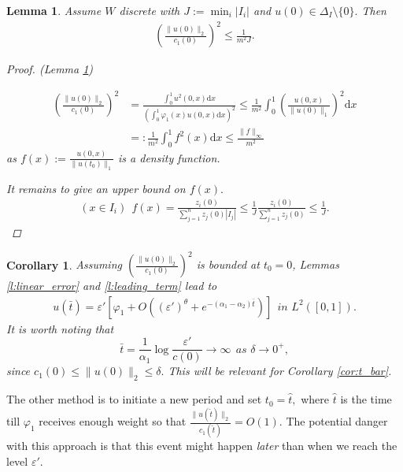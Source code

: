 \documentclass{article}
\renewcommand{\d}{\mathrm{d}}
\newcommand{\1}[1]{{\mathds{1}}_{\left\{#1\right\}}}
\newtheorem{lemma}{Lemma}
\newtheorem{corollary}{Corollary}
\begin{document}
\begin{lemma}
\label{l:discrite_initial_bound}
Assume $W$ discrete with $J:=\min_{i} |I_i|$ and $u(0) \in \Delta_I \setminus \{0\}.$ Then
\begin{align*}
\left(\frac{\|u(0) \|_2}{c_1(0)} \right)^2 \leq \frac{1}{m^2 J}.
\end{align*}
\begin{proof}(Lemma \ref{l:discrite_initial_bound})
	
	\begin{align*}
		\left(\frac{\| u(0)\|_2}{c_1(0)} \right)^2&=\frac{\int_{0}^{1}u^2(0,x) \d x}{\left( \int_{0}^{1} \varphi_1(x) u(0,x) \d x \right)^2} \leq \frac{1}{m^2} \int_{0}^{1} \left( \frac{u(0,x)}{\|u(0) \|_1} \right)^2 \d x\\
		&=:\frac{1}{m^2} \int_{0}^{1} f^2(x) \d x \leq \frac{\| f\|_{\infty}}{m^2}
	\end{align*}	
	as $f(x):=\frac{u(0,x)}{\|u(t_0) \|_1}$ is a density function.
	
	It remains to give an upper bound on $f(x).$
	\begin{align*}
		(x \in I_i) \ \ f(x)= \frac{z_i(0)}{\sum_{j=1}^n z_j(0)|I_j|} \leq \frac{1}{J} \frac{z_i(0)}{\sum_{j=1}^n z_j(0)} \leq \frac{1}{J}.
	\end{align*}
\end{proof}


\end{lemma}

\begin{corollary}
Assuming $\left(\frac{\|u(0) \|_2}{c_1(0)} \right)^2$ is bounded at $t_0=0$, Lemmas \ref{l:linear_error} and \ref{l:leading_term} lead to
\begin{align}
	\label{eq:epsilon'_level1}
	u(\bar{t})=\varepsilon' \left[\varphi_1+O\left((\varepsilon')^{\theta}+e^{-(\alpha_1-\alpha_2)\bar{t}} \right) \right] \ \ \textit{in } L^2([0,1]).
\end{align}
It is worth noting that
$$\bar{t}=\frac{1}{\alpha_1}\log \frac{\varepsilon'}{c(0)} \to  \infty \ \ \textit{as } \delta \to 0^{+}, $$ 	
since $c_1(0) \leq \|u(0) \|_2 \leq \delta.$ This will be relevant for Corollary \ref{cor:t_bar}.
\end{corollary}

The other method is to initiate a new period and set $t_0=\hat{t},$ where $\hat{t}$ is the time till $\varphi_1$ receives enough weight so that $\frac{\| u(\hat{t})\|_2}{c_1(\hat{t})}=O(1).$ The potential danger with this approach is that this event might happen \emph{later} than when we reach the level $\varepsilon'$.
\end{document}
